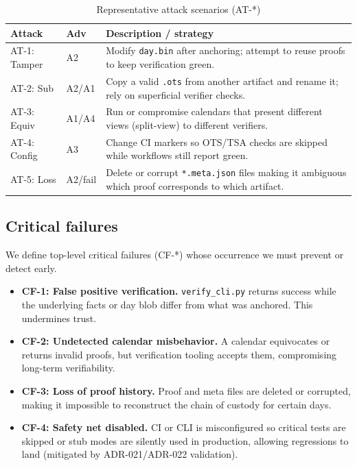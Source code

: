 \begin{table}[H]
  \centering
  \caption{Representative attack scenarios (AT-*)}
  \begin{tabularx}{\textwidth}{l l >{\raggedright\arraybackslash}X}
    \toprule
    \textbf{Attack} & \textbf{Adv} & \textbf{Description / strategy} \\
    \midrule
    AT-1: Tamper & A2 & Modify \texttt{day.bin} after anchoring; attempt to reuse proofs to keep verification green. \\
    \addlinespace
    AT-2: Sub & A2/A1 & Copy a valid \texttt{.ots} from another artifact and rename it; rely on superficial verifier checks. \\
    \addlinespace
    AT-3: Equiv & A1/A4 & Run or compromise calendars that present different views (split-view) to different verifiers. \\
    \addlinespace
    AT-4: Config & A3 & Change \ac{CI} markers so \ac{OTS}/\ac{TSA} checks are skipped while workflows still report green. \\
    \addlinespace
    AT-5: Loss & A2/fail & Delete or corrupt \texttt{*.meta.json} files making it ambiguous which proof corresponds to which artifact. \\
    \bottomrule
  \end{tabularx}
\end{table}

\subsection{Critical failures}
We define top-level critical failures (CF-*) whose occurrence we must prevent or detect early.
\begin{itemize}[nosep]
  \item \textbf{CF-1: False positive verification.} \texttt{verify\_cli.py} returns success while the underlying facts or day blob differ from what was anchored.
  This undermines trust.
  \item \textbf{CF-2: Undetected calendar misbehavior.} A calendar equivocates or returns invalid proofs, but verification tooling accepts them, compromising long-term verifiability.
  \item \textbf{CF-3: Loss of proof history.} Proof and meta files are deleted or corrupted, making it impossible to reconstruct the chain of custody for certain days.
  \item \textbf{CF-4: Safety net disabled.} \ac{CI} or \ac{CLI} is misconfigured so critical tests are skipped or stub modes are silently used in production, allowing regressions to land (mitigated by \ac{ADR}-021/\ac{ADR}-022 validation).
\end{itemize}

